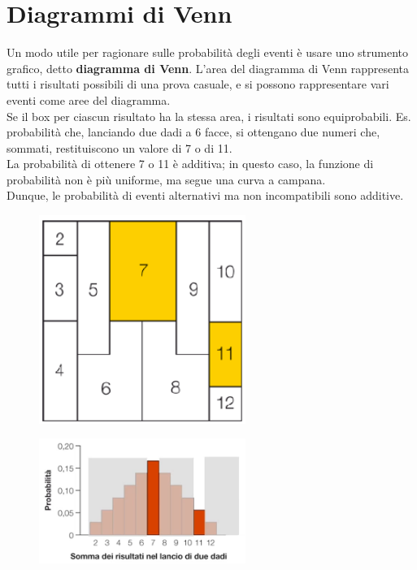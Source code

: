 \documentclass[10pt, draft]{book}
\begin{document}
\section{Diagrammi di Venn}
Un modo utile per ragionare sulle probabilità degli eventi è usare uno strumento grafico, detto \textbf{diagramma di Venn}. L'area del diagramma di Venn rappresenta tutti i risultati possibili di una prova casuale, e si possono rappresentare vari eventi come aree del diagramma. 
\\
Se il box per ciascun risultato ha la stessa area, i risultati sono equiprobabili.
Es. probabilità che, lanciando due dadi a 6 facce, si ottengano due numeri che, sommati, restituiscono un valore di 7 o di 11.
\\
La probabilità di ottenere 7 o 11 è additiva; in questo caso, la funzione di probabilità non è più uniforme, ma segue una curva a campana.
\\
Dunque, le probabilità di eventi alternativi ma non incompatibili sono additive.
\begin{figure}[h]\label{fig5.5-1}
    \centering
    \includegraphics[width=0.6\textwidth]{fig5.5-1}
    \caption{\small{}}
\end{figure}
\begin{figure}[h]\label{istogrammaperdiagramma}
    \centering
    \includegraphics[width=0.6\textwidth]{istogrammaperdiagramma}
    \caption{\small{}}
\end{figure}
\end{document}

